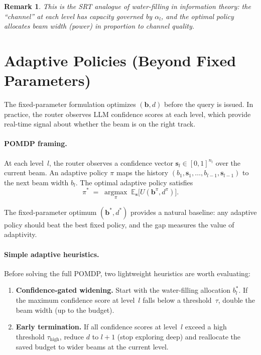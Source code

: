 \documentclass[11pt]{article}
\newcommand{\E}{\mathbb{E}}
\newcommand{\bvec}{\mathbf{b}}
\theoremstyle{plain}
\newtheorem{remark}{Remark}
\begin{document}
\begin{remark}
This is the SRT analogue of water-filling in
information theory: the ``channel'' at each level has capacity governed
by $\alpha_l$, and the optimal policy allocates beam width (power) in
proportion to channel quality.
\end{remark}

\section{Adaptive Policies (Beyond Fixed Parameters)}
\label{sec:adaptive}

The fixed-parameter formulation optimizes $(\bvec, d)$ before the
query is issued.  In practice, the router observes LLM confidence
scores at each level, which provide real-time signal about whether the
beam is on the right track.

\paragraph{POMDP framing.}
At each level~$l$, the router observes a confidence vector
$\mathbf{s}_l \in [0,1]^{n_l}$ over the current beam.  An adaptive
policy $\pi$ maps the history
$(b_1, \mathbf{s}_1, \ldots, b_{l-1}, \mathbf{s}_{l-1})$ to the
next beam width $b_l$.  The optimal adaptive policy satisfies
\[
  \pi^* \;=\; \operatorname*{argmax}_\pi\;
    \E_{\mathbf{s}}\!\bigl[U(\bvec^{\pi}, d^{\pi})\bigr].
\]

The fixed-parameter optimum $(\bvec^*, d^*)$ provides a natural
baseline: any adaptive policy should beat the best fixed policy, and
the gap measures the value of adaptivity.

\paragraph{Simple adaptive heuristics.}
Before solving the full POMDP, two lightweight heuristics are worth
evaluating:

\begin{enumerate}[nosep]
  \item \textbf{Confidence-gated widening.}
    Start with the water-filling allocation $b_l^*$.  If the maximum
    confidence score at level~$l$ falls below a threshold~$\tau$,
    double the beam width (up to the budget).
  \item \textbf{Early termination.}
    If all confidence scores at level~$l$ exceed a high threshold
    $\tau_{\mathrm{high}}$, reduce $d$ to $l + 1$ (stop exploring
    deep) and reallocate the saved budget to wider beams at the
    current level.
\end{enumerate}
\end{document}
